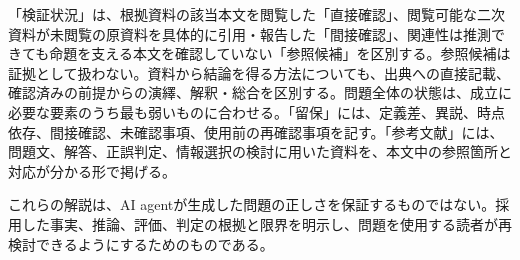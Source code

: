 「検証状況」は、根拠資料の該当本文を閲覧した「直接確認」、閲覧可能な二次資料が未閲覧の原資料を具体的に引用・報告した「間接確認」、関連性は推測できても命題を支える本文を確認していない「参照候補」を区別する。参照候補は証拠として扱わない。資料から結論を得る方法についても、出典への直接記載、確認済みの前提からの演繹、解釈・総合を区別する。問題全体の状態は、成立に必要な要素のうち最も弱いものに合わせる。「留保」には、定義差、異説、時点依存、間接確認、未確認事項、使用前の再確認事項を記す。「参考文献」には、問題文、解答、正誤判定、情報選択の検討に用いた資料を、本文中の参照箇所と対応が分かる形で掲げる。

これらの解説は、AI agentが生成した問題の正しさを保証するものではない。採用した事実、推論、評価、判定の根拠と限界を明示し、問題を使用する読者が再検討できるようにするためのものである。
